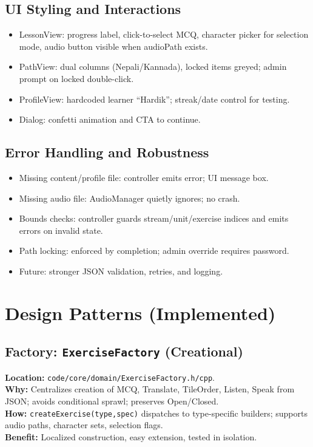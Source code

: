 \documentclass{article}
\begin{document}
\subsection{UI Styling and Interactions}
\begin{itemize}
  \item LessonView: progress label, click-to-select MCQ, character picker for selection mode, audio button visible when audioPath exists.
  \item PathView: dual columns (Nepali/Kannada), locked items greyed; admin prompt on locked double-click.
  \item ProfileView: hardcoded learner “Hardik”; streak/date control for testing.
  \item Dialog: confetti animation and CTA to continue.
\end{itemize}
\subsection{Error Handling and Robustness}
\begin{itemize}
  \item Missing content/profile file: controller emits error; UI message box.
  \item Missing audio file: AudioManager quietly ignores; no crash.
  \item Bounds checks: controller guards stream/unit/exercise indices and emits errors on invalid state.
  \item Path locking: enforced by completion; admin override requires password.
  \item Future: stronger JSON validation, retries, and logging.
\end{itemize}

\section{Design Patterns (Implemented)}
\subsection{Factory: \texttt{ExerciseFactory} (Creational)}
\textbf{Location:} \texttt{code/core/domain/ExerciseFactory.h/cpp}.\\
\textbf{Why:} Centralizes creation of MCQ, Translate, TileOrder, Listen, Speak from JSON; avoids conditional sprawl; preserves Open/Closed.\\
\textbf{How:} \texttt{createExercise(type,spec)} dispatches to type-specific builders; supports audio paths, character sets, selection flags.\\
\textbf{Benefit:} Localized construction, easy extension, tested in isolation.
\end{document}
